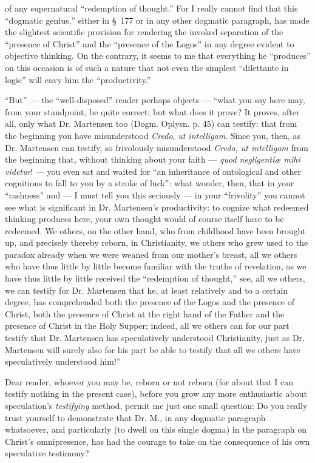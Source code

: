 \documentclass[12pt,a4paper,openany]{book}
\newcommand{\opage}[1]{\marginnote{\footnotesize\textit{[#1]}}}
\begin{document}
\setcounter{footnote}{0}%
\opage{39}of any supernatural ``redemption of thought.'' For I really
cannot find that this ``dogmatic genius,'' either in §~177
or in any other dogmatic paragraph, has made the slightest
scientific provision for rendering the invoked separation of
the ``presence of Christ'' and the ``presence of the Logos''
in any degree evident to objective thinking. On the contrary,
it seems to me that everything he ``produces'' on this
occasion is of such a nature that not even the simplest
``dilettante in logic'' will envy him the ``productivity.''


``But'' --- the ``well-disposed'' reader perhaps objects ---
``what you say here may, from your standpoint, be quite
correct; but what does it prove? It proves, after all, only
what Dr. Martensen too (Dogm. Oplysn. p. 45) can testify:
that from the beginning you have misunderstood \textit{Credo},
\textit{ut intelligam}. Since you, then, as Dr. Martensen can
testify, so frivolously misunderstood \textit{Credo, ut intelligam}
from the beginning that, without thinking about your faith
--- \textit{quod negligentiæ mihi videtur}! --- you even sat and
waited for ``an inheritance of ontological and other cognitions
to fall to you by a stroke of luck'': what wonder, then,
that in your ``rashness'' and --- I must tell you this seriously
--- in your ``frivolity'' you cannot see what is significant
in Dr. Martensen's productivity: to cognize what redeemed
thinking produces here, your own thought would of course
itself have to be redeemed. We others, on the other hand, who
from childhood have been brought up, and precisely thereby
reborn, in Christianity, we others who grew used to the paradox
already when we were weaned from our mother's breast, all we
others who have thus little by little become familiar with the
\setcounter{footnote}{0}%
\opage{40}truths of revelation, as we have thus little by little received
the ``redemption of thought,'' see, all we others, we can testify
for Dr. Martensen that he, at least relatively and to a certain
degree, has comprehended both the presence of the Logos and the
presence of Christ, both the presence of Christ at the right
hand of the Father and the presence of Christ in the Holy Supper;
indeed, all we others can for our part testify that Dr. Martensen
has speculatively understood Christianity, just as Dr. Martensen
will surely also for his part be able to testify that all we
others have speculatively understood him!''

Dear reader, whoever you may be, reborn or not reborn
(for about that I can testify nothing in the present case),
before you grow any more enthusiastic about speculation's
\emph{testifying} method, permit me just one small question:
Do you really trust yourself to demonstrate that Dr. M., in
any dogmatic paragraph whatsoever, and particularly (to dwell
on this single dogma) in the paragraph on Christ's omnipresence,
has had the courage to take on the consequence of his own
speculative testimony?
\end{document}
